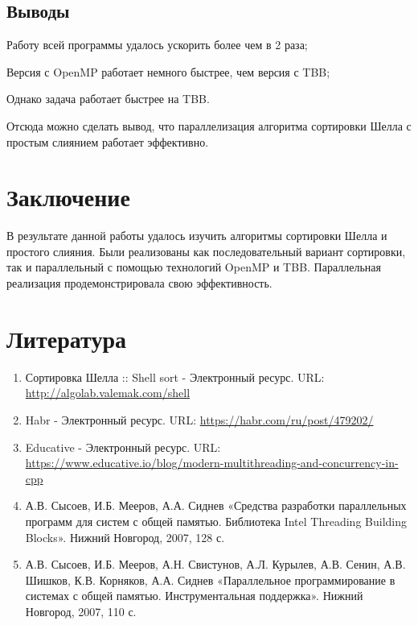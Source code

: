 \documentclass[]{article}
\theoremstyle{remark}
\theoremstyle{definition}
\begin{document}
\subsection{Выводы}

\par Работу всей программы удалось ускорить более чем в 2 раза;
\par Версия с OpenMP работает немного быстрее, чем версия с TBB;
\par Однако задача работает быстрее на TBB.

\par Отсюда можно сделать вывод, что параллелизация алгоритма сортировки Шелла с простым слиянием работает эффективно.

\newpage

\section{Заключение}

\par В результате данной работы удалось изучить алгоритмы сортировки Шелла и простого слияния. Были реализованы как последовательный вариант сортировки, так и параллельный с помощью технологий OpenMP и TBB. Параллельная реализация продемонстрировала свою эффективность. 

\newpage

\section{Литература}
\begin{enumerate}
\item Сортировка Шелла :: Shell sort - Электронный ресурс. URL: \newline \url{http://algolab.valemak.com/shell}
\item Habr - Электронный ресурс. URL: \newline \url{https://habr.com/ru/post/479202/}
\item Educative - Электронный ресурс. URL: \newline \url{https://www.educative.io/blog/modern-multithreading-and-concurrency-in-cpp}
\item А.В. Сысоев, И.Б. Мееров, А.А. Сиднев «Средства разработки параллельных программ для систем с общей памятью. Библиотека Intel Threading Building Blocks». Нижний Новгород, 2007, 128 с. 
\item А.В. Сысоев, И.Б. Мееров, А.Н. Свистунов, А.Л. Курылев, А.В. Сенин, А.В. Шишков, К.В. Корняков, А.А. Сиднев «Параллельное программирование в системах с общей
памятью. Инструментальная поддержка». Нижний Новгород, 2007, 110 с. 
\end{enumerate}
\end{document}
